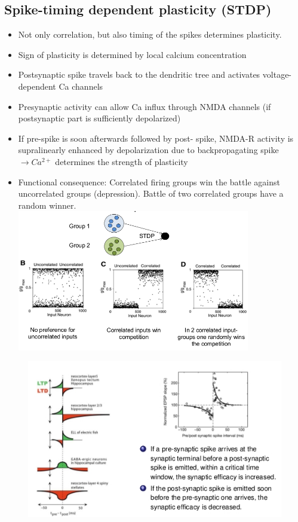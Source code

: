 \documentclass[english,11pt]{article}
\begin{document}
\subsection{Spike-timing dependent plasticity (STDP)}
\begin{itemize}
\item Not only correlation, but also timing of the spikes determines plasticity.
\item Sign of plasticity is determined by local calcium
concentration
\item Postsynaptic spike travels back to the dendritic tree and activates voltage-dependent Ca channels
\item Presynaptic activity can allow Ca influx through
NMDA channels (if postsynaptic part is sufficiently
depolarized)
\item If pre-spike is soon afterwards followed by post-
spike, NMDA-R activity is supralinearly enhanced by
depolarization due to backpropagating spike
$\rightarrow Ca^{2+}$ determines the strength of plasticity
\item Functional consequence:
\subitem Correlated firing groups win the battle against uncorrelated groups (depression). Battle of two correlated groups have a random winner.\\
\includegraphics[width=0.8\textwidth]{STDP-consequences.png}
\end{itemize}


\begin{figure}[htbp]
\centering
  \includegraphics[scale=0.7]{images/8_1.jpg}
\end{figure} 
\end{document}

